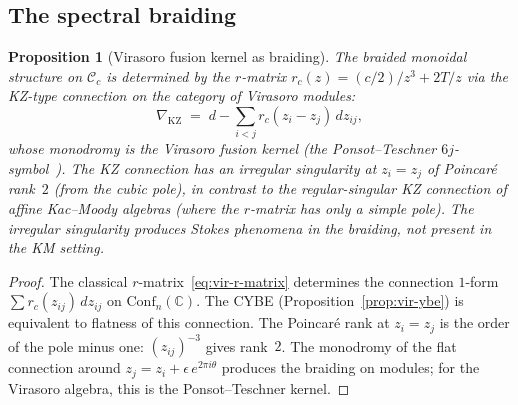 \documentclass[11pt,reqno]{amsart}
\newtheorem{proposition}[theorem]{Proposition}
\theoremstyle{definition}
\theoremstyle{remark}
\begin{document}
\subsection{The spectral braiding}

\begin{proposition}[Virasoro fusion kernel as braiding]
\label{prop:fusion-braiding}
The braided monoidal structure on $\mathcal{C}_c$ is determined
by the $r$-matrix $r_c(z) = (c/2)/z^3 + 2T/z$
via the KZ-type connection on the category of Virasoro modules:
\begin{equation}\label{eq:fusion-braiding}
\nabla_{\mathrm{KZ}}
\;=\;
d - \sum_{i < j} r_c(z_i - z_j)\,dz_{ij},
\end{equation}
whose monodromy is the Virasoro fusion kernel
(the Ponsot--Teschner $6j$-symbol~\cite{PT01}).
The KZ connection has an irregular singularity at $z_i = z_j$
of Poincar\'{e} rank~$2$ (from the cubic pole), in contrast
to the regular-singular KZ connection of affine Kac--Moody
algebras (where the $r$-matrix has only a simple pole).
The irregular singularity produces Stokes phenomena in the
braiding, not present in the KM setting.
\end{proposition}

\begin{proof}
The classical $r$-matrix~\eqref{eq:vir-r-matrix} determines the
connection $1$-form $\sum r_c(z_{ij})\,dz_{ij}$ on
$\mathrm{Conf}_n(\mathbb{C})$. The CYBE
(Proposition~\ref{prop:vir-ybe}) is equivalent to flatness of this
connection. The Poincar\'{e} rank at $z_i = z_j$ is the order of
the pole minus one: $(z_{ij})^{-3}$ gives rank~$2$. The
monodromy of the flat connection around $z_j = z_i + \epsilon\,
e^{2\pi i\theta}$ produces the braiding on modules; for
the Virasoro algebra, this is the Ponsot--Teschner kernel.
\end{proof}
\end{document}

